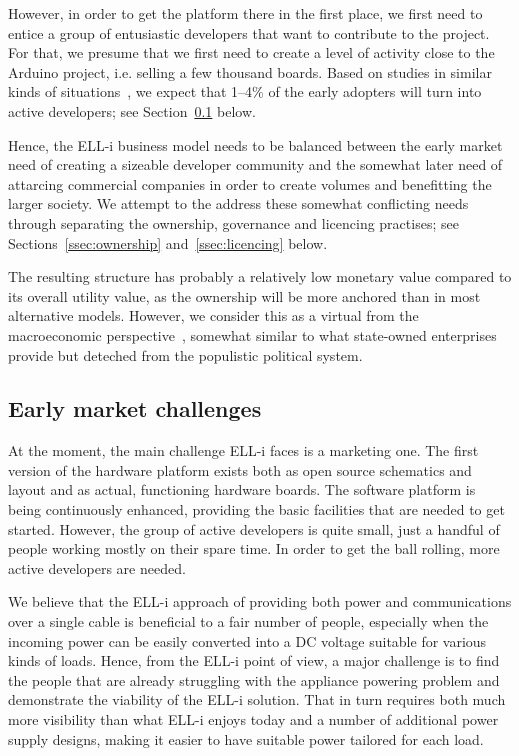 \documentclass[draft,a4paper]{siamltex}
\begin{document}
However, in order to get the platform there in the first place, we
first need to entice a group of entusiastic developers that want to
contribute to the project.  For that, we presume that we first need to
create a level of activity close to the Arduino project, i.e. selling
a few thousand boards.  Based on studies in similar kinds of
situations~\cite{need-reference}, we expect that 1--4\% of the early
adopters will turn into active developers; see
Section~\ref{ssec:earlymarket} below.

Hence, the ELL-i business model needs to be balanced between the early
market need of creating a sizeable developer community and the
somewhat later need of attarcing commercial companies in order to
create volumes and benefitting the larger society.  We attempt to the
address these somewhat conflicting needs through separating the
ownership, governance and licencing practises; see
Sections~\ref{ssec:ownership} and~\ref{ssec:licencing} below.

The resulting structure has probably a relatively low monetary value
compared to its overall utility value, as the ownership will be more
anchored than in most alternative models.  However, we consider this
as a virtual from the macroeconomic
perspective~\cite{Olson2002}, somewhat similar to what
state-owned enterprises provide but deteched from the populistic
political system.

\subsection{Early market challenges}
\label{ssec:earlymarket}

At the moment, the main challenge ELL-i faces is a marketing one.  The
first version of the hardware platform exists both as open source
schematics and layout and as actual, functioning hardware boards.  The
software platform is being continuously enhanced, providing the basic
facilities that are needed to get started.  However, the group of
active developers is quite small, just a handful of people working
mostly on their spare time.  In order to get the ball rolling, more
active developers are needed.

We believe that the ELL-i approach of providing both power and
communications over a single cable is beneficial to a fair number of
people, especially when the incoming power can be easily converted
into a DC voltage suitable for various kinds of loads.  Hence, from
the ELL-i point of view, a major challenge is to find the people that
are already struggling with the appliance powering problem and
demonstrate the viability of the ELL-i solution.  That in turn
requires both much more visibility than what ELL-i enjoys today and a
number of additional power supply designs, making it easier to have
suitable power tailored for each load.
\end{document}
